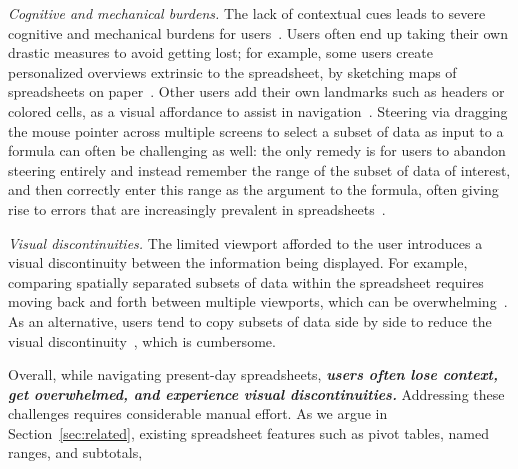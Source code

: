 \item {\em Cognitive and mechanical burdens.}
The lack of contextual cues leads to severe
cognitive and mechanical burdens
for users~\cite{cockburn2009review}.
Users often end up taking their own drastic measures to
avoid getting lost; for example,
some users create personalized overviews
extrinsic to the spreadsheet,
by sketching maps
of spreadsheets on paper~\cite{network-context}.
Other users add their own landmarks such as headers or
colored cells, as a visual affordance to assist
in navigation~\cite{network-context}.
Steering via dragging the mouse pointer across multiple screens to select
a subset of data as input to a formula
can often be challenging as well:
the only remedy is for users to abandon steering entirely and
instead remember the range of
the subset of data of interest, and then correctly enter this range
as the argument to the formula, often giving rise to errors that are increasingly prevalent in spreadsheets~\cite{panko1998we}.


\item {\em Visual discontinuities.}
The limited viewport afforded to the user
introduces a visual discontinuity between the
information being displayed.
For example, comparing spatially separated subsets
of data within the spreadsheet
requires moving back and forth between multiple viewports,
which can be overwhelming~\cite{nardi1990spreadsheet,network-context}.
As an alternative, users tend to copy subsets of data side by side to
reduce the visual discontinuity~\cite{nardi1990spreadsheet,network-context},
which is cumbersome.
\squishend

\noindent
Overall,  while navigating present-day spreadsheets, 
{\bf \em users often lose context,
get overwhelmed, and experience visual discontinuities.} 
Addressing these challenges requires considerable manual effort.
As we  argue in Section~\ref{sec:related},
existing spreadsheet features such as
pivot tables, named ranges, and subtotals,


